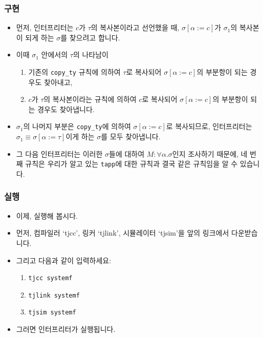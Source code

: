 \documentclass[slidestop,compress,mathserif]{beamer}
\begin{document}
    \begin{frame}
        \frametitle{구현}
        \begin{itemize}
            \item 먼저, 인터프리터는 $c$가 $\tau$의 복사본이라고 선언했을 때, $\sigma \left[ \alpha := c \right]$가 $\sigma_1$의 복사본이 되게 하는 $\sigma$를 찾으려고 합니다.
            \item 이때 $\sigma_1$ 안에서의 $\tau$의 나타남이
            \begin{enumerate}
                \item 기존의 \texttt{copy\_ty} 규칙에 의하여 $\tau$로 복사되어 $\sigma \left[ \alpha := c \right]$의 부분항이 되는 경우도 찾아내고,
                \item $c$가 $\tau$의 복사본이라는 규칙에 의하여 $c$로 복사되어 $\sigma \left[ \alpha := c \right]$의 부분항이 되는 경우도 찾아냅니다.
            \end{enumerate}
            \item $\sigma_1$의 나머지 부분은 \texttt{copy\_ty}에 의하여 $\sigma \left[ \alpha := c \right]$로 복사되므로, 인터프리터는 $\sigma_1 \equiv \sigma \left[ \alpha := \tau \right]$이게 하는 $\sigma$를 모두 찾아냅니다.
            \item 그 다음 인터프리터는 이러한 $\sigma$들에 대하여 $M : \forall \alpha . \sigma$인지 조사하기 때문에, 네 번째 규칙은 우리가 알고 있는 \texttt{tapp}에 대한 규칙과 결국 같은 규칙임을 알 수 있습니다.
        \end{itemize}
    \end{frame}

    \begin{frame}
        \frametitle{실행}
        \begin{itemize}
            \item 이제, 실행해 봅시다.
            \item 먼저, 컴파일러 `tjcc', 링커 `tjlink', 시뮬레이터 `tjsim'을 앞의 링크에서 다운받습니다.
            \item 그리고 다음과 같이 입력하세요:
            \begin{enumerate}
                \item \texttt{tjcc systemf}
                \item \texttt{tjlink systemf}
                \item \texttt{tjsim systemf}
            \end{enumerate}
            \item 그러면 인터프리터가 실행됩니다.
        \end{itemize}
    \end{frame}
\end{document}
